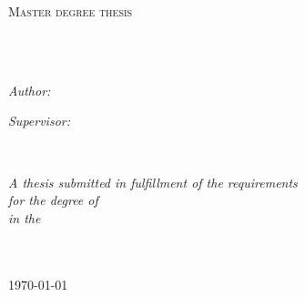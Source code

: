 \documentclass[
12pt, %
oneside, %
english, %
singlespacing, %
headsepline, %
]{MastersDoctoralThesis} %
\author{Qiangsen He}
\begin{document}
\frontmatter %

\pagestyle{plain} %


\begin{titlepage}
\begin{center}

\vspace*{.06\textheight}
{\scshape\LARGE \univname\par}\vspace{1.5cm} %
\textsc{\Large Master degree thesis}\\[0.5cm] %

\HRule \\[0.4cm] %
{\huge \bfseries \ttitle\par}\vspace{0.4cm} %
\HRule \\[1.5cm] %
 
\begin{minipage}[t]{0.4\textwidth}
\begin{flushleft} \large
\emph{Author:}\\
\href{http://www.johnsmith.com}{\authorname} %
\end{flushleft}
\end{minipage}
\begin{minipage}[t]{0.4\textwidth}
\begin{flushright} \large
\emph{Supervisor:} \\
\href{http://www.jamessmith.com}{\supname} %
\end{flushright}
\end{minipage}\\[3cm]
 
\vfill

\large \textit{A thesis submitted in fulfillment of the requirements\\ for the degree of \degreename}\\[0.3cm] %
\textit{in the}\\[0.4cm]
\groupname\\\deptname\\[2cm] %
 
\vfill

{\large \today}\\[4cm] %
 
\vfill
\end{center}
\end{titlepage}
\end{document}
